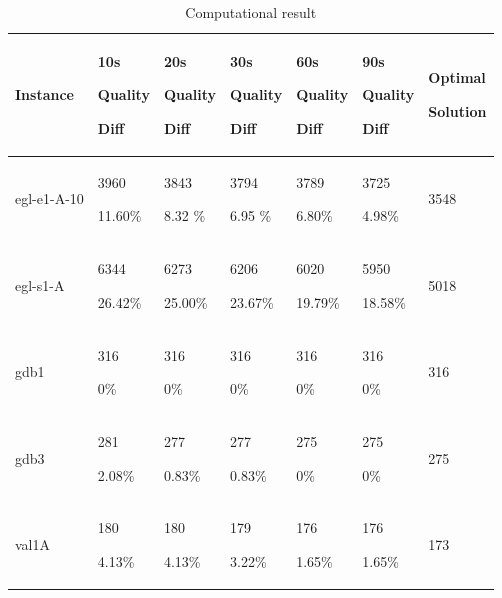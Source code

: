 \documentclass[journal,twoside,web]{ieeecolor}
\begin{document}
\begin{table}
\caption{Computational result}
\label{table:result}
\setlength{\tabcolsep}{3pt}
\begin{tabular}{|p{40pt}|p{28pt}|p{28pt}|p{28pt}|p{28pt}|p{28pt}|p{30pt}|}
\hline
    Instance       & 10s\par Quality\par  Diff & 20s\par Quality\par Diff & 30s\par Quality \par Diff & 60s\par Quality\par Diff & 90s\par Quality\par Diff & Optimal \par Solution \\ \hline
       egl-e1-A-10 &    3960 \par 11.60\%  &    3843\par 8.32 \%  &    3794\par 6.95 \% &    3789 \par 6.80\%  &    3725\par 4.98\%   &    3548          \\ 
       egl-s1-A    &    6344 \par 26.42\% &    6273\par 25.00\%  &    6206\par 23.67\%  & 6020\par 19.79\%     &    5950\par 18.58\%  &    5018          \\ 
       gdb1        & 316 \par 0\%     & 316 \par 0\%    & 316 \par 0\%      & 316 \par 0\% & 316 \par 0\%    & 316      \\
       gdb3        & 281\par 2.08\%          & 277 \par 0.83\%            & 277  \par 0.83\% & 275\par 0\% & 275\par 0\% & 275               \\
       val1A       & 180 \par 4.13\%  & 180 \par 4.13\%   & 179 \par 3.22\% & 176 \par 1.65\% & 176 \par 1.65\%    & 173    \\

\end{tabular}
\end{table}
\end{document}

